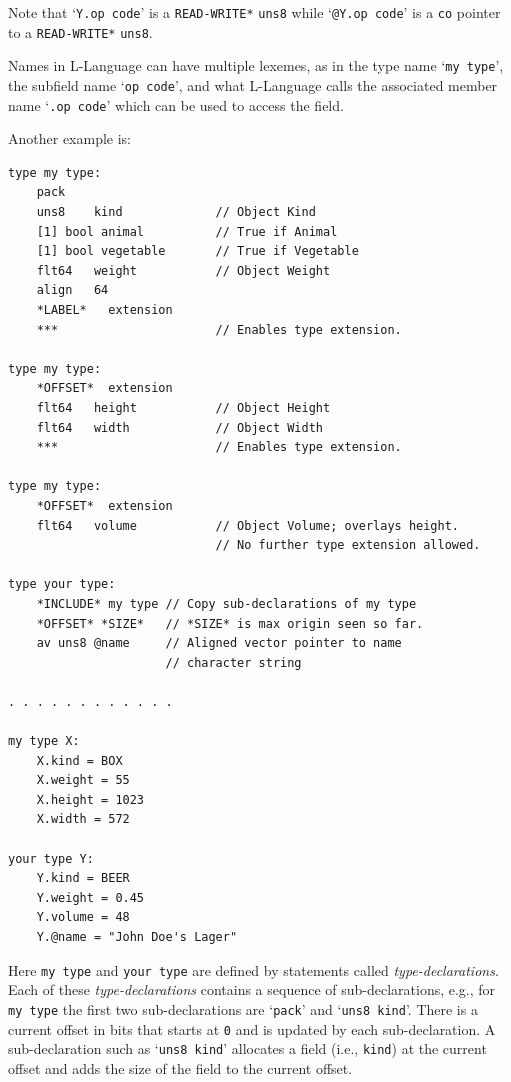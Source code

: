 \documentclass[12pt]{article}
\newenvironment{indpar}[1][0.3in]%
	{\begin{list}{}%
		     {\setlength{\itemsep}{0in}%
		      \setlength{\topsep}{0in}%
		      \setlength{\parsep}{1ex}%
		      \setlength{\labelwidth}{#1}%
		      \setlength{\leftmargin}{#1}%
		      \addtolength{\leftmargin}{\labelsep}}%
	 \item}%
	{\end{list}}
\begin{document}
Note that `{\tt Y.op code}' is a {\tt *READ-WRITE*}
{\tt uns8} while `{\tt @Y.op code}' is a {\tt co} pointer to
a {\tt *READ-WRITE*} {\tt uns8}.

Names in L-Language can have multiple lexemes, as in
the type name `{\tt my type}', the subfield name `{\tt op code}',
and what L-Language calls the
associated member name `{\tt .op code}' which can be used to access
the field.

Another example is:

\begin{indpar}\begin{verbatim}
type my type:
    pack
    uns8    kind             // Object Kind
    [1] bool animal          // True if Animal
    [1] bool vegetable       // True if Vegetable
    flt64   weight           // Object Weight
    align   64
    *LABEL*   extension
    ***                      // Enables type extension.

type my type:
    *OFFSET*  extension
    flt64   height           // Object Height
    flt64   width            // Object Width
    ***                      // Enables type extension.

type my type:
    *OFFSET*  extension
    flt64   volume           // Object Volume; overlays height.
                             // No further type extension allowed.

type your type:
    *INCLUDE* my type // Copy sub-declarations of my type
    *OFFSET* *SIZE*   // *SIZE* is max origin seen so far.
    av uns8 @name     // Aligned vector pointer to name
                      // character string

. . . . . . . . . . . .

my type X:
    X.kind = BOX
    X.weight = 55
    X.height = 1023
    X.width = 572

your type Y:
    Y.kind = BEER
    Y.weight = 0.45
    Y.volume = 48
    Y.@name = "John Doe's Lager"
\end{verbatim}\end{indpar}

Here {\tt my type} and {\tt your type} are defined by
statements called {\em type-declarations}.  Each of these
{\em type-declarations} contains a sequence of sub-declarations, e.g.,
for {\tt my type} the first two sub-declarations are
`{\tt pack}' and `{\tt uns8 kind}'.  There is a current
offset in bits that starts at {\tt 0} and is updated by each sub-declaration.
A sub-declaration such as `{\tt uns8 kind}' allocates a field
(i.e., {\tt kind})
at the current offset and adds the size of the field to the
current offset.
\end{document}
